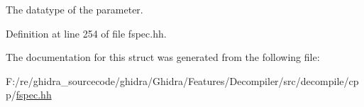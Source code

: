 The datatype of the parameter. 



Definition at line 254 of file fspec.\+hh.



The documentation for this struct was generated from the following file\+:\begin{DoxyCompactItemize}
\item 
F\+:/re/ghidra\+\_\+sourcecode/ghidra/\+Ghidra/\+Features/\+Decompiler/src/decompile/cpp/\mbox{\hyperlink{fspec_8hh}{fspec.\+hh}}\end{DoxyCompactItemize}
